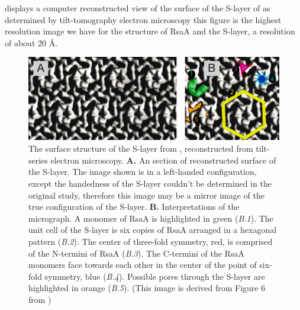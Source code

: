  displays a computer reconstructed view of the surface of the \ac{S-layer} of \caulobacter as determined by tilt-tomography electron microscopy this figure is the highest resolution image we have for the structure of RsaA and the \ac{S-layer}, a resolution of about 20 \AA{}. 



\begin{figure}[htb]
  \begin{center}
    \includegraphics[width=\textwidth]{intro/img/slayermicrograph.pdf}
  \end{center}
  \caption[Reconstructed surface of the \caulobacter \ac{S-layer}]{
    The surface structure of the \ac{S-layer} from \caulobacter, reconstructed from tilt-series electron microscopy. \textbf{A.} An section of reconstructed surface of the \caulobacter \ac{S-layer}. The image shown is in a left-handed configuration, except the handedness of the \ac{S-layer} couldn't be determined in the original study, therefore this image may be a mirror image of the true configuration of the \ac{S-layer}. \textbf{B.} Interpretations of the micrograph.  A monomer of RsaA is highlighted in green (\textit{B.1}).  The unit cell of the \ac{S-layer} is six copies of RsaA arranged in a hexagonal pattern (\textit{B.2}).  The center of three-fold symmetry, red, is comprised of the N-termini of RsaA (\textit{B.3}).  The C-termini of the RsaA monomers face towards each other in the center of the point of six-fold symmetry, blue (\textit{B.4}). Possible pores through the \ac{S-layer} are highlighted in orange (\textit{B.5}). (This image is derived from Figure 6 from )
  }
  \label{fig:intro-micrograph}
\end{figure}   

